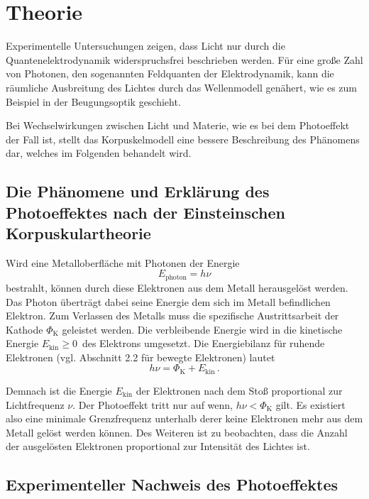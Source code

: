 \section{Theorie}
\label{sec:Theorie}

Experimentelle Untersuchungen zeigen, dass Licht nur durch die Quantenelektrodynamik widerspruchsfrei beschrieben werden.
Für eine große Zahl von Photonen, den sogenannten Feldquanten der Elektrodynamik,
kann die räumliche Ausbreitung des Lichtes durch das Wellenmodell genähert, wie es zum Beispiel in der Beugungsoptik geschieht. 

Bei Wechselwirkungen zwischen Licht und Materie, wie es bei dem Photoeffekt der Fall ist, 
stellt das Korpuskelmodell eine bessere Beschreibung des Phänomens dar, welches im Folgenden behandelt wird.
 

\subsection{Die Phänomene und Erklärung des Photoeffektes nach der Einsteinschen Korpuskulartheorie}

Wird eine Metalloberfläche mit Photonen der Energie
\begin{equation}
    E_\text{photon} = h \nu     \label{eq:photonenenergie}
\end{equation}
bestrahlt, können durch diese Elektronen aus dem Metall herausgelöst werden. 
Das Photon überträgt dabei seine Energie dem sich im Metall befindlichen Elektron. 
Zum Verlassen des Metalls muss die spezifische Austrittsarbeit der Kathode $\Phi_\text{K}$ geleistet werden.
Die verbleibende Energie wird in die kinetische Energie $E_\text{kin} \geq 0 \,$ des Elektrons umgesetzt. 
Die Energiebilanz für ruhende Elektronen (vgl. Abschnitt 2.2 für bewegte Elektronen) lautet
\begin{equation}
    h \nu = \Phi_\text{K} + E_\text{kin} \, .    \label{eq:bilanz_elektron} 
\end{equation}

Demnach ist die Energie $E_\text{kin}$ der Elektronen nach dem Stoß proportional zur Lichtfrequenz $\nu$.
Der Photoeffekt tritt nur auf wenn, $h \nu < \Phi_\text{K}$ gilt.
Es existiert also eine minimale Grenzfrequenz unterhalb derer keine Elektronen mehr aus dem Metall gelöst werden können.
Des Weiteren ist zu beobachten, dass die Anzahl der ausgelösten Elektronen proportional zur Intensität des Lichtes ist.


\subsection{Experimenteller Nachweis des Photoeffektes} \label{sec:nachweis}

